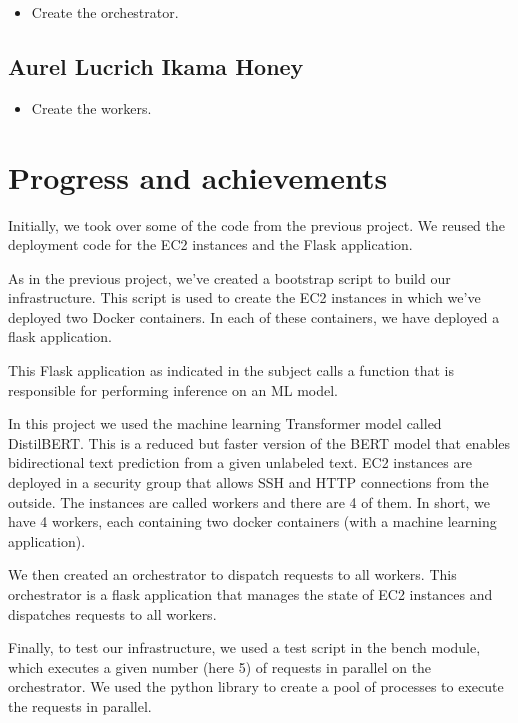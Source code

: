 \documentclass[letterpaper,headings=standardclasses,parskip=half]{scrartcl}
\begin{document}
\begin{itemize}
    \item Create the orchestrator.
\end{itemize}

\subsection*{Aurel Lucrich Ikama Honey}

\begin{itemize}
    \item Create the workers.
\end{itemize}

\section{Progress and achievements}

Initially, we took over some of the code from the previous project. We reused the deployment code for the EC2 instances and the Flask application.

As in the previous project, we've created a bootstrap script to build our infrastructure. This script is used to create the EC2 instances in which we've deployed two Docker containers. In each of these containers, we have deployed a flask application.

This Flask application as indicated in the subject calls a function that is responsible for performing inference on an ML model.

In this project we used the machine learning Transformer model called DistilBERT. This is a reduced but faster version of the BERT model that enables bidirectional text prediction from a given unlabeled text. EC2 instances are deployed in a security group that allows SSH and HTTP connections from the outside. The instances are called workers and there are 4 of them. In short, we have 4 workers, each containing two docker containers (with a machine learning application).

We then created an orchestrator to dispatch requests to all workers. This orchestrator is a flask application that manages the state of EC2 instances and dispatches requests to all workers.

Finally, to test our infrastructure, we used a test script in the bench module, which executes a given number (here 5) of requests in parallel on the orchestrator. We used the python library  to create a pool of processes to execute the requests in parallel.
\end{document}
